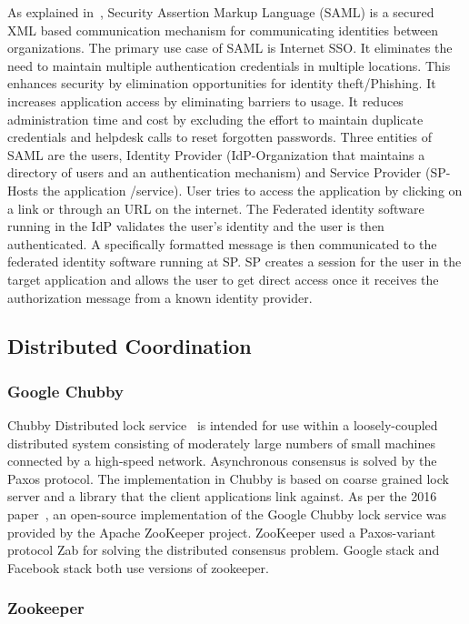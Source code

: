 {As explained in~\cite{www-SAML}, Security Assertion Markup Language
(SAML) is a secured XML based communication mechanism for
communicating identities between organizations. The primary use case
of SAML is Internet SSO. It eliminates the need to maintain multiple
authentication credentials in multiple locations. This enhances
security by elimination opportunities for identity theft/Phishing. It
increases application access by eliminating barriers to usage. It
reduces administration time and cost by excluding the effort to
maintain duplicate credentials and helpdesk calls to reset forgotten
passwords. Three entities of SAML are the users, Identity Provider
(IdP-Organization that maintains a directory of users and an
authentication mechanism) and Service Provider (SP-Hosts the
application /service). User tries to access the application by
clicking on a link or through an URL on the internet. The Federated
identity software running in the IdP validates the user's identity and
the user is then authenticated. A specifically formatted message is
then communicated to the federated identity software running at SP. SP
creates a session for the user in the target application and allows
the user to get direct access once it receives the authorization
message from a known identity provider.

\subsection{Distributed Coordination}


\subsubsection{Google Chubby \cv}

Chubby Distributed lock service~\cite{www-chubby} is intended for use
within a loosely-coupled distributed system consisting of moderately
large numbers of small machines connected by a high-speed
network. Asynchronous consensus is solved by the Paxos protocol. The
implementation in Chubby is based on coarse grained lock server and a
library that the client applications link against.  As per the 2016
paper~\cite{chubby-paper-2016}, an open-source implementation of the
Google Chubby lock service was provided by the Apache ZooKeeper
project. ZooKeeper used a Paxos-variant protocol Zab for solving the
distributed consensus problem.  Google stack and Facebook stack both
use versions of zookeeper.
     
\subsubsection{Zookeeper \cv}
 
}

